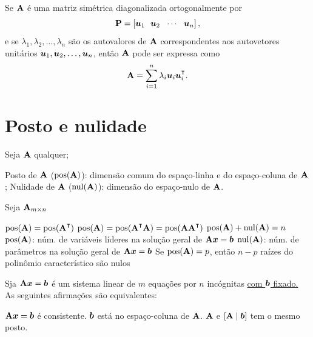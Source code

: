 \begin{theorem}
	Se $\mathbf{A}$ é uma matriz simétrica diagonalizada ortogonalmente por
	\begin{equation}
		\mathbf{P} = \left[\bm{u}_1 \ \ \bm{u}_2 \ \ \cdots \ \ \bm{u}_n\right],
	\end{equation}
	e se $\lambda_1,\lambda_2,\ldots,\lambda_n$ são os autovalores de $\mathbf{A}$ correspondentes aos autovetores unitários $\bm{u}_1,\bm{u}_2,\ldots,\bm{u}_n$, então $\mathbf{A}$ pode ser expressa como
	\begin{equation}
		\m{A} = \sum_{i=1}^n \lambda_i \v{u}_i\v{u}_i\T.
	\end{equation}
\end{theorem}

\section{Posto e nulidade}

\begin{definition} Seja $\mathbf{A}$ qualquer;
	\leavevmode
	\begin{outline}[enumerate]
		\1 Posto de $\mathbf{A}$ ($\operatorname{pos}(\mathbf{A})$): dimensão comum do espaço-linha e do espaço-coluna de $\mathbf{A}$;
		\1 Nulidade de $\mathbf{A}$ ($\operatorname{nul}(\mathbf{A})$): dimensão do espaço-nulo de $\mathbf{A}$.
	\end{outline}
\end{definition}

\begin{theorem} Seja $\mathbf{A}_{m\times n}$
	\leavevmode
	\begin{outline}[enumerate]
		\1 \( \pos(\m{A}) = \pos(\m{A}\T) \)
		\1 \( \pos(\m{A}) = \pos(\m{A}\T\m{A}) =  \pos(\m{A}\m{A}\T)\)
		\1 \( \operatorname{pos}(\mathbf{A}) + \operatorname{nul}(\mathbf{A}) = n \)
		\1 $\operatorname{pos}(\mathbf{A})$: núm. de variáveis líderes na solução geral de $\mathbf{A}\bm{x}=\bm{b}$
		\1 $\operatorname{nul}(\mathbf{A})$: núm. de parâmetros na solução geral de $\mathbf{A}\bm{x}=\bm{b}$
		\1 Se $\operatorname{pos}(\mathbf{A}) = p$, então $n-p$ raízes do polinômio característico são nulos 
	\end{outline}
\end{theorem}

\begin{theorem} Sja $\mathbf{A}\bm{x}=\bm{b}$ é um sistema linear de $m$ equações por $n$ incógnitas \underline{com $\bm{b}$ fixado.} As seguintes afirmações são equivalentes:
	\leavevmode
	\begin{outline}[enumerate]
		\1 $\mathbf{A}\bm{x}=\bm{b}$ é consistente.
		\1 $\bm{b}$ está no espaço-coluna de $\mathbf{A}$.
		\1 $\mathbf{A}$ e $[\mathbf{A} \mid \bm{b}]$ tem o mesmo posto. 
	\end{outline}
\end{theorem}

